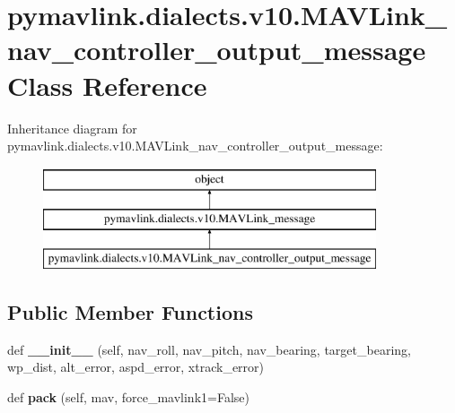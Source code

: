 \hypertarget{classpymavlink_1_1dialects_1_1v10_1_1MAVLink__nav__controller__output__message}{}\section{pymavlink.\+dialects.\+v10.\+M\+A\+V\+Link\+\_\+nav\+\_\+controller\+\_\+output\+\_\+message Class Reference}
\label{classpymavlink_1_1dialects_1_1v10_1_1MAVLink__nav__controller__output__message}
Inheritance diagram for pymavlink.\+dialects.\+v10.\+M\+A\+V\+Link\+\_\+nav\+\_\+controller\+\_\+output\+\_\+message\+:\begin{figure}[H]
\begin{center}
\leavevmode
\includegraphics[height=3.000000cm]{classpymavlink_1_1dialects_1_1v10_1_1MAVLink__nav__controller__output__message}
\end{center}
\end{figure}
\subsection*{Public Member Functions}
\begin{DoxyCompactItemize}
\item 
\mbox{\label{classpymavlink_1_1dialects_1_1v10_1_1MAVLink__nav__controller__output__message_a68d23732088200b545641bb084b7d75f}} 
def {\bfseries \+\_\+\+\_\+init\+\_\+\+\_\+} (self, nav\+\_\+roll, nav\+\_\+pitch, nav\+\_\+bearing, target\+\_\+bearing, wp\+\_\+dist, alt\+\_\+error, aspd\+\_\+error, xtrack\+\_\+error)
\item 
\mbox{\label{classpymavlink_1_1dialects_1_1v10_1_1MAVLink__nav__controller__output__message_ab58159703e71c3bfd724b657954eabcb}} 
def {\bfseries pack} (self, mav, force\+\_\+mavlink1=False)
\end{DoxyCompactItemize}
